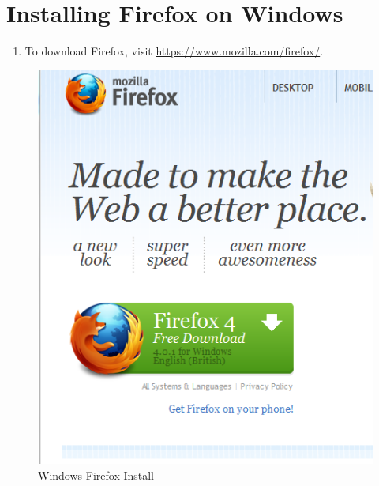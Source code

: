 \section{Installing Firefox on Windows}

\begin{enumerate}[1.]
\item
  To download Firefox, visit
  \href{https://www.mozilla.com/firefox/}{https://www.mozilla.com/firefox/}.
\end{enumerate}
\begin{figure}[htbp]
\centering
\includegraphics{ff_win_inst_1.png}
\caption{Windows Firefox Install}
\end{figure}

